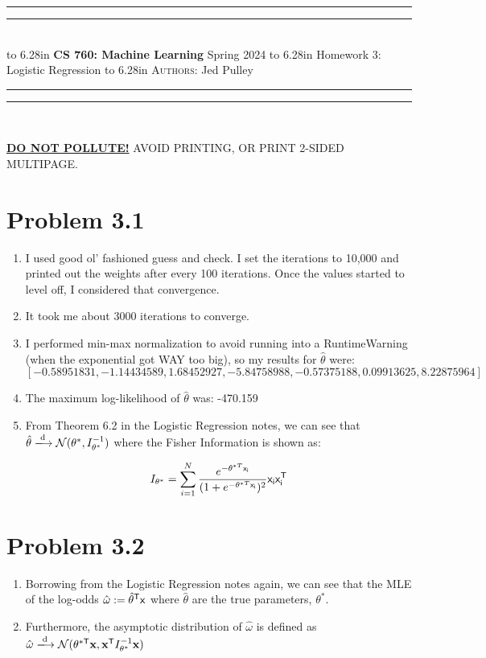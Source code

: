 \documentclass{article}
\newcommand{\lecture}[2]{
\pagestyle{myheadings}
\thispagestyle{plain}
\newpage
\noindent
\begin{center}
\rule{\textwidth}{1.6pt}\vspace*{-\baselineskip}\vspace*{2pt} %
\rule{\textwidth}{0.4pt}\\[1\baselineskip] %
\vbox{\vspace{2mm}
\hbox to 6.28in { {\bf CS 760: Machine Learning} \hfill Spring 2024 }
\vspace{4mm}
\hbox to 6.28in { {\Large \hfill #1  \hfill} }
\vspace{4mm}
\hbox to 6.28in { {\scshape Authors:}  #2 \hfill }}
\vspace{-2mm}
\rule{\textwidth}{0.4pt}\vspace*{-\baselineskip}\vspace{3.2pt} %
\rule{\textwidth}{1.6pt}\\[\baselineskip] %
\end{center}
\vspace*{4mm}
}
\begin{document}
\lecture{Homework 3: Logistic Regression}{Jed Pulley}

\begin{center}
{\Large {\sf \underline{\textbf{DO NOT POLLUTE!}} AVOID PRINTING, OR PRINT 2-SIDED MULTIPAGE.}}
\end{center}

\section*{Problem 3.1}
\begin{enumerate}[label=(\alph*)]
  \item I used good ol' fashioned guess and check. I set the iterations to 10,000 and printed out the weights after every 100 iterations. Once the values started to level off, I considered that convergence.
  \item It took me about 3000 iterations to converge.
  \item I performed min-max normalization to avoid running into a RuntimeWarning (when the exponential got WAY too big), so my results for $\hat{\theta}$ were: \[[-0.58951831, -1.14434589, 1.68452927, -5.84758988, -0.57375188, 0.09913625, 8.22875964]\]
  \item The maximum log-likelihood of $\hat{\theta}$ was: -470.159
  \item From Theorem 6.2 in the Logistic Regression notes, we can see that $\hat{\theta} \xlongrightarrow[\text{}]{\text{d}} \mathcal{N}(\theta^*, I^{-1}_{\theta^*})$ where the Fisher Information is shown as: \[I_{\theta^*} = \sum_{i=1}^{N}\frac{e^{-\theta^{*T}\sf{x}_i}}{(1 + e^{-\theta^{*T}\sf{x}_i})^2}\sf{x}_i\sf{x}^{\sf{T}}_i\]
\end{enumerate}

\section*{Problem 3.2}
\begin{enumerate}[label=(\alph*)]
  \item Borrowing from the Logistic Regression notes again, we can see that the MLE of the log-odds $\hat{\omega} := \hat{\theta}^{\sf{T}}\sf{x}$ where $\hat{\theta}$ are the true parameters, $\theta^*$.
  \item Furthermore, the asymptotic distribution of $\hat{\omega}$ is defined as $\hat{\omega} \xlongrightarrow[\text{}]{\text{d}} \mathcal{N}(\theta^{*\sf{T}}\textbf{x}, \textbf{x}^{\sf{T}}I^{-1}_{\theta^*}\textbf{x})$
\end{enumerate}
\end{document}
